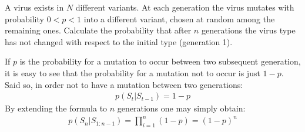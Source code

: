 \Exercise[number={2}]
A virus exists in \(N\) different variants. At each generation the virus
mutates with probability \(0<p<1\) into a different variant, chosen at
random among the remaining ones. Calculate the probability that after \(n\) 
generations the virus type has not changed with respect to the initial
type (generation 1). 

\Answer[number={2}]
If \(p\) is the probability for a mutation to occur between two subsequent
generation, it is easy to see that the probability for a mutation not to
occur is just \(1-p\).\\
Said so, in order not to have a mutation between two generations:
\begin{align*}
    p(S_t|S_{t-1})=1-p
\end{align*}
By extending the formula to \(n\) generations one may simply obtain:
\begin{align*}
    p(S_n|S_{1:n-1})=\prod_{i=1}^{n}(1-p)=(1-p)^n
\end{align*}